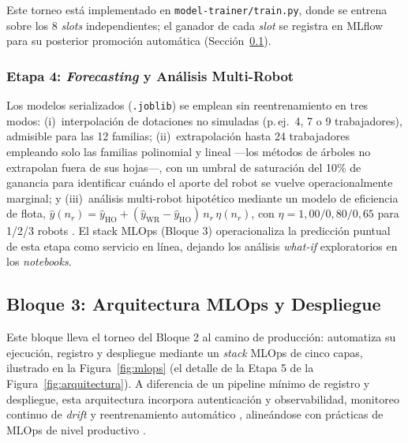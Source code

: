 \documentclass[conference]{IEEEtran}
\begin{document}
Este torneo está implementado en \texttt{model-trainer/train.py}, donde se entrena sobre los 8 \textit{slots} independientes; el ganador de cada \textit{slot} se registra en MLflow para su posterior promoción automática (Sección~\ref{sec:mlops}).

\subsubsection{Etapa 4: \textit{Forecasting} y Análisis Multi-Robot}

Los modelos serializados (\texttt{.joblib}) se emplean sin reentrenamiento en tres modos: (i)~interpolación de dotaciones no simuladas (p.\,ej.\ 4, 7 o 9 trabajadores), admisible para las 12 familias; (ii)~extrapolación hasta 24 trabajadores empleando solo las familias polinomial y lineal —los métodos de árboles no extrapolan fuera de sus hojas—, con un umbral de saturación del 10\% de ganancia para identificar cuándo el aporte del robot se vuelve operacionalmente marginal; y (iii)~análisis multi-robot hipotético mediante un modelo de eficiencia de flota, $\hat{y}(n_r) = \hat{y}_{\mathrm{HO}} + (\hat{y}_{\mathrm{WR}} - \hat{y}_{\mathrm{HO}})\, n_r\, \eta(n_r)$, con $\eta = 1{,}00/0{,}80/0{,}65$ para 1/2/3 robots \cite{emmi2014,garcia2026}. El stack MLOps (Bloque 3) operacionaliza la predicción puntual de esta etapa como servicio en línea, dejando los análisis \textit{what-if} exploratorios en los \textit{notebooks}.

\subsection{Bloque 3: Arquitectura MLOps y Despliegue}
\label{sec:mlops}

Este bloque lleva el torneo del Bloque 2 al camino de producción: automatiza su ejecución, registro y despliegue mediante un \textit{stack} MLOps de cinco capas, ilustrado en la Figura~\ref{fig:mlops} (el detalle de la Etapa 5 de la Figura~\ref{fig:arquitectura}). A diferencia de un pipeline mínimo de registro y despliegue, esta arquitectura incorpora autenticación y observabilidad, monitoreo continuo de \textit{drift} y reentrenamiento automático \cite{autodrift2025}, alineándose con prácticas de MLOps de nivel productivo \cite{arunkumar2025,singh2025,ozimek2026}.
\end{document}
